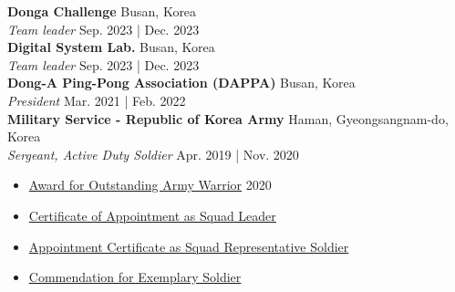 \documentclass[a4paper,9pt]{extarticle}
\begin{document}
\noindent
\large{\textbf{Donga Challenge}}  \hfill Busan, Korea\\ %
\textit{Team leader} \hfill Sep. 2023 | Dec. 2023%
\\

\noindent
\large{\textbf{Digital System Lab.}}  \hfill Busan, Korea\\ %
\textit{Team leader} \hfill Sep. 2023 | Dec. 2023%
\\

\noindent
\large{\textbf{Dong-A Ping-Pong Association (DAPPA)}}  \hfill Busan, Korea\\ %
\textit{President} \hfill Mar. 2021 | Feb. 2022 \\%

\noindent
\large{\textbf{Military Service - Republic of Korea Army}} \hfill Haman, Gyeongsangnam-do, Korea \\
\textit{Sergeant, Active Duty Soldier} \hfill Apr. 2019 | Nov. 2020
\begin{itemize}
    \item \href{https://github.com/user-attachments/assets/584d8f84-5bbe-4a71-9ae3-bda5ce40bd6f}{Award for Outstanding Army Warrior} \hfill 2020 
    \item \href{https://github.com/user-attachments/assets/d3b82b44-dff0-4d58-a944-747f46f8a50e}{Certificate of Appointment as Squad Leader}
    \item \href{https://github.com/user-attachments/assets/8565647d-3609-4866-8e18-fbdf9a9e227c}{Appointment Certificate as Squad Representative Soldier}
    \item \href{https://github.com/user-attachments/assets/f4f76912-92a7-440e-b8a2-4ce52b1ec39a}{Commendation for Exemplary Soldier}
\end{itemize}
\end{document}
